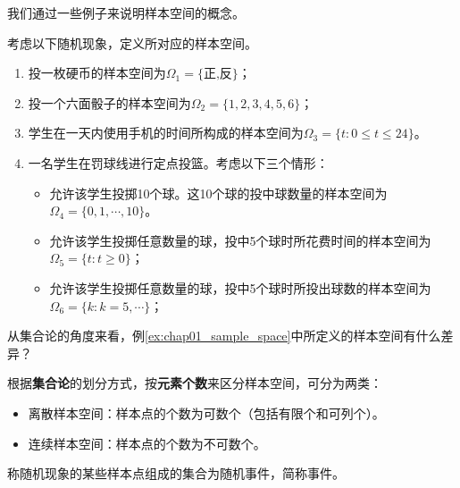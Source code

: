 我们通过一些例子来说明样本空间的概念。
\begin{example}\label{ex:chap01_sample_space}考虑以下随机现象，定义所对应的样本空间。
\begin{enumerate}
\item 投一枚硬币的样本空间为$\Omega_1 =\{\text{正,反}\}$；
\item 投一个六面骰子的样本空间为$\Omega_2 =\{1,2,3,4,5,6\}$；
    \item 学生在一天内使用手机的时间所构成的样本空间为$\Omega_3 =\{t:0 \leq t \leq 24\}$。
 \item 一名学生在罚球线进行定点投篮。考虑以下三个情形：
      \begin{itemize}
        \item 允许该学生投掷10个球。这10个球的投中球数量的样本空间为$\Omega_{4} =\{0,1,\cdots ,10\}$。
        \item 允许该学生投掷任意数量的球，投中5个球时所花费时间的样本空间为$\Omega_{5} =\{t:t\geq 0\}$；
        \item 允许该学生投掷任意数量的球，投中5个球时所投出球数的样本空间为$\Omega_6=\{k:k=5,\cdots\}$；
      \end{itemize}
    \end{enumerate}
\end{example}

\begin{problem}
从集合论的角度来看，例\ref{ex:chap01_sample_space}中所定义的样本空间有什么差异？
\end{problem}

\begin{remark}
    根据{\bf 集合论}的划分方式，按{\bf 元素个数}来区分样本空间，可分为两类：
 \begin{itemize}
 \item 离散样本空间：样本点的个数为可数个（包括有限个和可列个）。
 \item 连续样本空间：样本点的个数为不可数个。
 \end{itemize}
\end{remark}


\begin{definition}[随机事件] \label{def:random event} 
称随机现象的某些样本点组成的集合为随机事件，简称事件。
\end{definition}

